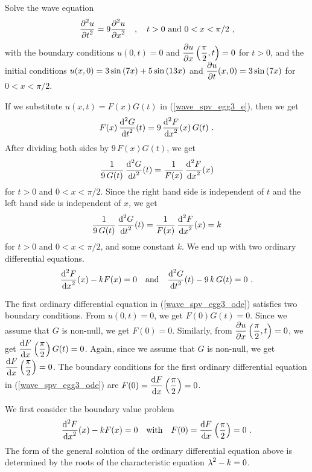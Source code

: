 \begin{egg}
Solve the wave equation
\begin{equation} \label{wave_spv_egg3_e}
\frac{\displaystyle \partial^{2}{u}} {\displaystyle \partial t^{2}} = 9 \frac{\displaystyle \partial^{2}{u}} {\displaystyle \partial x^{2}} \quad ,
\quad t > 0 \ \text{and} \ 0 < x < \pi/2 \ , 
\end{equation}
with the boundary conditions
$u(0,t) = 0$ and $\displaystyle \frac{\partial{u}}{\partial x}\left(\frac{\pi}{2},t\right) = 0$
for $t > 0$, and the initial conditions
$\displaystyle u(x,0) = 3 \sin\left(7 x\right) + 5 \sin\left(13 x\right)$
and
$\displaystyle \frac{\partial{u}}{\partial t}(x,0) = 3 \sin\left(7 x\right)$
for $0 < x < \pi/2$.

If we substitute $u(x,t) = F(x)G(t)$ in (\ref{wave_spv_egg3_e}), then we get
\[
F(x)\,\frac{\displaystyle \mathrm{d}^{2}{G}} {\displaystyle \mathrm{d}{t}^{2}}(t) = 9\, \frac{\displaystyle \mathrm{d}^{2}{F}} {\displaystyle \mathrm{d}{x}^{2}}(x)\, G(t) \ .
\]
After dividing both sides by $9\,F(x)G(t)$, we get
\[
\frac{1}{9\,G(t)} \, \frac{\displaystyle \mathrm{d}^{2}{G}} {\displaystyle \mathrm{d}{t}^{2}}(t) = \frac{1}{F(x)}\, \frac{\displaystyle \mathrm{d}^{2}{F}} {\displaystyle \mathrm{d}{x}^{2}}(x)
\]
for $t>0$ and $0<x<\pi/2$.
Since the right hand side is independent of $t$ and the left hand side
is independent of $x$, we get
\[
\frac{1}{9\,G(t)} \, \frac{\displaystyle \mathrm{d}^{2}{G}} {\displaystyle \mathrm{d}{t}^{2}}(t) = \frac{1}{F(x)}\,
\frac{\displaystyle \mathrm{d}^{2}{F}} {\displaystyle \mathrm{d}{x}^{2}}(x) = k
\]
for $t>0$ and $0<x<\pi/2$, and some constant $k$.  We end up with two
ordinary differential equations.
\begin{equation} \label{wave_spv_egg3_ode}
\frac{\displaystyle \mathrm{d}^{2}{F}} {\displaystyle \mathrm{d}{x}^{2}}(x) -k F(x) = 0 \quad \text{and}
\quad \frac{\displaystyle \mathrm{d}^{2}{G}} {\displaystyle \mathrm{d}{t}^{2}}(t) - 9\,k\,G(t) = 0 \ .
\end{equation}

The first ordinary differential equation in (\ref{wave_spv_egg3_ode})
satisfies two boundary conditions.   From $u(0,t) = 0$, we get
$F(0)G(t)=0$.  Since we assume that $G$ is non-null, we get
$F(0)=0$.  Similarly, from
$\displaystyle \frac{\partial{u}}{\partial x}\left(\frac{\pi}{2},t\right) = 0$, we get
$\displaystyle \frac{\mathrm{d}F}{\mathrm{d}{x}}\left(\frac{\pi}{2}\right)G(t)=0$.
Again, since we assume that $G$ is non-null, we get
$\displaystyle \frac{\mathrm{d}F}{\mathrm{d}{x}}\left(\frac{\pi}{2}\right)=0$.  The
boundary conditions for the first ordinary differential equation in
(\ref{wave_spv_egg3_ode}) are
$\displaystyle F(0)=\frac{\mathrm{d}F}{\mathrm{d}{x}}\left(\frac{\pi}{2}\right)=0$. 

We first consider the boundary value problem
\begin{equation} \label{wave_spv_egg3_bvp}
\frac{\displaystyle \mathrm{d}^{2}{F}} {\displaystyle \mathrm{d}{x}^{2}}(x) -k F(x) = 0 \quad \text{with} \quad
F(0)=\frac{\mathrm{d}F}{\mathrm{d}{x}}\left(\frac{\pi}{2}\right)=0 \  .
\end{equation}
The form of the general solution of the ordinary differential equation
above is determined by the roots of the characteristic equation
$\displaystyle \lambda^2-k=0$.


\end{egg}
